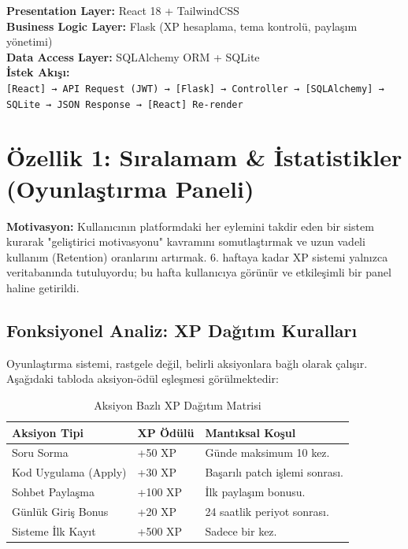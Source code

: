 \documentclass[12pt,a4paper]{article}
\begin{document}
\begin{infobox}
  \small
  \textbf{Presentation Layer:} React 18 + TailwindCSS\\
  \textbf{Business Logic Layer:} Flask (XP hesaplama, tema kontrolü, paylaşım yönetimi)\\
  \textbf{Data Access Layer:} SQLAlchemy ORM + SQLite\\[0.4em]
  \textbf{İstek Akışı:}\\
  \texttt{[React] → API Request (JWT) → [Flask] → Controller → [SQLAlchemy] → SQLite → JSON Response → [React] Re-render}
\end{infobox}

\newpage

\section{Özellik 1: Sıralamam \& İstatistikler (Oyunlaştırma Paneli)}

\textbf{Motivasyon:} Kullanıcının platformdaki her eylemini takdir eden bir sistem kurarak "geliştirici motivasyonu" kavramını somutlaştırmak ve uzun vadeli kullanım (Retention) oranlarını artırmak. 6. haftaya kadar XP sistemi yalnızca veritabanında tutuluyordu; bu hafta kullanıcıya görünür ve etkileşimli bir panel haline getirildi.

\subsection{Fonksiyonel Analiz: XP Dağıtım Kuralları}
Oyunlaştırma sistemi, rastgele değil, belirli aksiyonlara bağlı olarak çalışır. Aşağıdaki tabloda aksiyon-ödül eşleşmesi görülmektedir:

\begin{table}[h!]
  \centering\small
  \begin{tabular}{@{} P{4.5cm} P{2.5cm} P{6.5cm} @{}}
    \toprule
    \textbf{Aksiyon Tipi} & \textbf{XP Ödülü} & \textbf{Mantıksal Koşul} \\
    \midrule
    Soru Sorma & +50 XP & Günde maksimum 10 kez. \\
    Kod Uygulama (Apply) & +30 XP & Başarılı patch işlemi sonrası. \\
    Sohbet Paylaşma & +100 XP & İlk paylaşım bonusu. \\
    Günlük Giriş Bonus & +20 XP & 24 saatlik periyot sonrası. \\
    Sisteme İlk Kayıt & +500 XP & Sadece bir kez. \\
    \bottomrule
  \end{tabular}
  \caption{Aksiyon Bazlı XP Dağıtım Matrisi}
\end{table}
\end{document}
